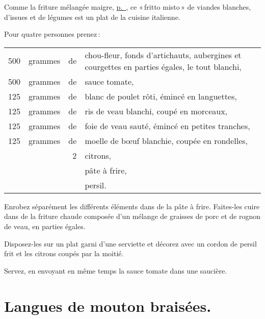 Comme la friture mélangée maigre, \hyperlink{p0315}{p. \pageref{pg0315}}, ce
« fritto misto » de viandes blanches, d'issues et de légumes est un plat de la
cuisine italienne.

\medskip

Pour quatre personnes prenez :

\footnotesize
\begin{longtable}{rrrp{18em}}
    500 & grammes & de & chou-fleur, fonds d'artichauts, aubergines et
                         courgettes en parties égales, le tout blanchi,                                   \\
    500 & grammes & de & sauce tomate,                                                                    \\
    125 & grammes & de & blanc de poulet rôti, émincé en languettes,                                      \\
    125 & grammes & de & ris de veau blanchi, coupé en morceaux,                                          \\
    125 & grammes & de & foie de veau sauté, émincé en petites tranches,                                  \\
    125 & grammes & de & moelle de bœuf blanchie, coupée en rondelles,                                    \\
        &         &  2 & citrons,                                                                         \\
        &         &    & pâte à frire,                                                                    \\
        &         &    & persil.                                                                          \\
\end{longtable}
\normalsize

Enrobez séparément les différents éléments dans de la pâte à frire. Faites-les
cuire dans de la friture chaude composée d'un mélange de graisses de porc et de
rognon de veau, en parties égales.

Disposez-les sur un plat garni d’une serviette et décorez avec un cordon de
persil frit et les citrons coupés par la moitié.

Servez, en envoyant en même temps la sauce tomate dans une saucière.

\section*{\centering Langues de mouton braisées.}
{}


